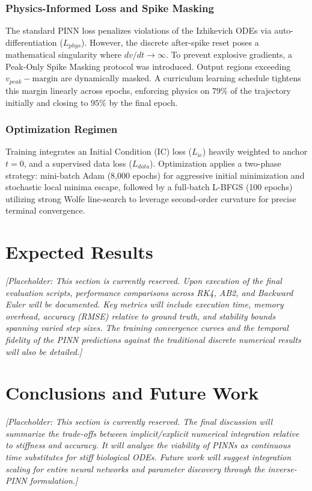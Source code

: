 \documentclass[conference]{IEEEtran}
\begin{document}
\subsubsection{Physics-Informed Loss and Spike Masking}
The standard PINN loss penalizes violations of the Izhikevich ODEs via auto-differentiation ($L_{phys}$). However, the discrete after-spike reset poses a mathematical singularity where $dv/dt \to \infty$. To prevent explosive gradients, a Peak-Only Spike Masking protocol was introduced. Output regions exceeding $v_{peak} - \text{margin}$ are dynamically masked. A curriculum learning schedule tightens this margin linearly across epochs, enforcing physics on $79\%$ of the trajectory initially and closing to $95\%$ by the final epoch.

\subsubsection{Optimization Regimen}
Training integrates an Initial Condition (IC) loss ($L_{ic}$) heavily weighted to anchor $t=0$, and a supervised data loss ($L_{data}$). Optimization applies a two-phase strategy: mini-batch Adam (8,000 epochs) for aggressive initial minimization and stochastic local minima escape, followed by a full-batch L-BFGS (100 epochs) utilizing strong Wolfe line-search to leverage second-order curvature for precise terminal convergence.

\section{Expected Results}

\textit{[Placeholder: This section is currently reserved. Upon execution of the final evaluation scripts, performance comparisons across RK4, AB2, and Backward Euler will be documented. Key metrics will include execution time, memory overhead, accuracy (RMSE) relative to ground truth, and stability bounds spanning varied step sizes. The training convergence curves and the temporal fidelity of the PINN predictions against the traditional discrete numerical results will also be detailed.]}

\section{Conclusions and Future Work}

\textit{[Placeholder: This section is currently reserved. The final discussion will summarize the trade-offs between implicit/explicit numerical integration relative to stiffness and accuracy. It will analyze the viability of PINNs as continuous time substitutes for stiff biological ODEs. Future work will suggest integration scaling for entire neural networks and parameter discovery through the inverse-PINN formulation.]}
\end{document}
